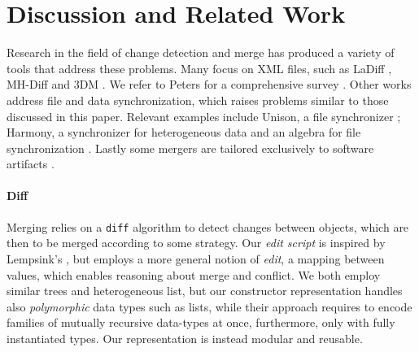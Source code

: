 \documentclass{sigplanconf}
\theoremstyle{plain}
\begin{document}

\section{Discussion and Related Work}
\label{sec:related-work}
Research in the field of change detection and merge has produced a
variety of tools that address these problems.  Many focus on XML
files, such as LaDiff \cite{Chawathe96}, MH-Diff \cite{Chawathe97} and
3DM \cite{Lind04, Lind05}.  We refer to Peters for a
comprehensive survey \cite{PetersSurvey}.
%
Other works address file and data synchronization, which raises
problems similar to those discussed in this paper. Relevant examples
include Unison, a file synchronizer \cite{Pierce98, UnisonSpec};
Harmony, a synchronizer for heterogeneous data
\cite{HarmonyOverview,Pierce07} and an algebra for file
synchronization \cite{Ramsey01}.
%
Lastly some mergers are tailored exclusively to software artifacts
\cite{Westfechtel91, Mens02, Apel11}. 

\paragraph{Diff}
Merging relies on a \texttt{diff} algorithm to detect changes between
objects, which are then to be merged according to some strategy.
%
Our \emph{edit script} is inspired by Lempsink's \cite{Lemp09}, but
employs a more general notion of \emph{edit}, a mapping between
values, which enables reasoning about merge and conflict.
%
%
We both employ similar trees and heterogeneous list, but our
constructor representation handles also \emph{polymorphic}
data types such as lists, while their approach requires 
to encode families of mutually recursive data-types
at once, furthermore, only with fully instantiated types.
Our representation is instead modular and reusable.
\end{document}
